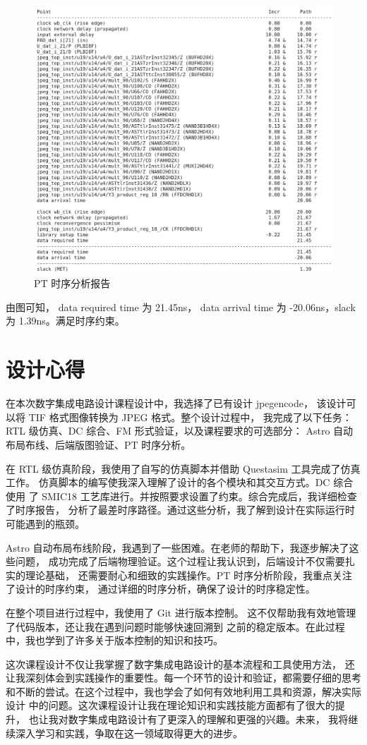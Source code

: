 \documentclass[12pt,hyperref,a4paper,UTF8]{ctexart}
\begin{document}
\begin{figure}[htbp]
    \centering
    \includegraphics[width =.7\textwidth]{figures/pt_timing.png}
    \caption{PT 时序分析报告}
    \label{pt_timing}
\end{figure}

由图可知， data required time 为 21.45\unit{\ns}， data arrival time 
为 -20.06\unit{\ns}，slack 为 1.39\unit{\ns}。满足时序约束。



\newpage
\section{设计心得}
在本次数字集成电路设计课程设计中，我选择了已有设计 jpegencode，
该设计可以将 TIF 格式图像转换为 JPEG 格式。整个设计过程中，
我完成了以下任务：RTL 级仿真、DC 综合、FM 形式验证，以及课程要求的可选部分：
Astro 自动布局布线、后端版图验证、PT 时序分析。

在 RTL 级仿真阶段，我使用了自写的仿真脚本并借助 Questasim 工具完成了仿真工作。
仿真脚本的编写使我深入理解了设计的各个模块和其交互方式。DC 综合使用
了 SMIC18 工艺库进行。并按照要求设置了约束。综合完成后，我详细检查了时序报告，
分析了最差时序路径。通过这些分析，我了解到设计在实际运行时可能遇到的瓶颈。

Astro 自动布局布线阶段，我遇到了一些困难。在老师的帮助下，我逐步解决了这些问题，
成功完成了后端物理验证。这个过程让我认识到，后端设计不仅需要扎实的理论基础，
还需要耐心和细致的实践操作。PT 时序分析阶段，我重点关注了设计的时序约束，
通过详细的时序分析，确保了设计的时序稳定性。

在整个项目进行过程中，我使用了 Git 进行版本控制。
这不仅帮助我有效地管理了代码版本，还让我在遇到问题时能够快速回溯到
之前的稳定版本。在此过程中，我也学到了许多关于版本控制的知识和技巧。

这次课程设计不仅让我掌握了数字集成电路设计的基本流程和工具使用方法，
还让我深刻体会到实践操作的重要性。每一个环节的设计和验证，都需要仔细的思考
和不断的尝试。在这个过程中，我也学会了如何有效地利用工具和资源，解决实际设计
中的问题。这次课程设计让我在理论知识和实践技能方面都有了很大的提升，
也让我对数字集成电路设计有了更深入的理解和更强的兴趣。未来，
我将继续深入学习和实践，争取在这一领域取得更大的进步。

\end{document}
